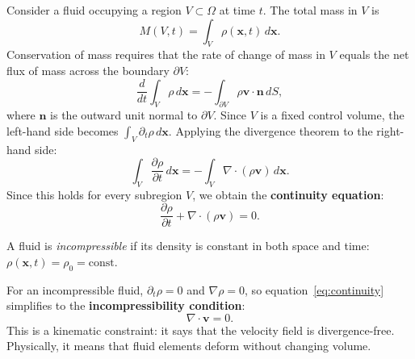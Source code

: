 Consider a fluid occupying a region $V \subset \Omega$ at time $t$. The total mass in $V$ is
\[
M(V, t) = \int_V \rho(\mathbf{x}, t) \, d\mathbf{x}.
\]
Conservation of mass requires that the rate of change of mass in $V$ equals the net flux of mass across the boundary $\partial V$:
\[
\frac{d}{dt} \int_V \rho \, d\mathbf{x} = -\int_{\partial V} \rho \mathbf{v} \cdot \mathbf{n} \, dS,
\]
where $\mathbf{n}$ is the outward unit normal to $\partial V$. Since $V$ is a fixed control volume, the left-hand side becomes $\int_V \partial_t \rho \, d\mathbf{x}$. Applying the divergence theorem to the right-hand side:
\[
\int_V \frac{\partial \rho}{\partial t} \, d\mathbf{x} = -\int_V \nabla \cdot (\rho \mathbf{v}) \, d\mathbf{x}.
\]
Since this holds for every subregion $V$, we obtain the \textbf{continuity equation}:
\begin{equation}
\label{eq:continuity}
\frac{\partial \rho}{\partial t} + \nabla \cdot (\rho \mathbf{v}) = 0.
\end{equation}

\begin{definition}
A fluid is \textit{incompressible} if its density is constant in both space and time: $\rho(\mathbf{x}, t) = \rho_0 = \text{const}$.
\end{definition}

For an incompressible fluid, $\partial_t \rho = 0$ and $\nabla \rho = 0$, so equation~\eqref{eq:continuity} simplifies to the \textbf{incompressibility condition}:
\begin{equation}
\label{eq:incompressibility}
\nabla \cdot \mathbf{v} = 0.
\end{equation}
This is a kinematic constraint: it says that the velocity field is divergence-free. Physically, it means that fluid elements deform without changing volume.

